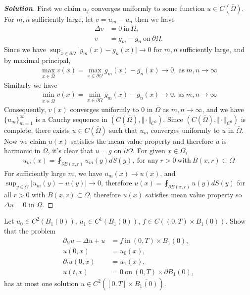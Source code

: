 \documentclass[11pt,reqno]{amsart}
\newcommand{\<}{\langle}
\renewcommand{\>}{\rangle}
\newcommand{\norm}[1]{\vert#1\vert}
\newcommand{\nnorm}[1]{\Vert#1\Vert}
\begin{document}
\begin{enumerate}[label={\arabic*.}]
\begin{proof}[\bf{Solution}]
First we claim $u_j$ converges uniformly to some function $u\in C(\bar{\Omega})$. For $m, n$ sufficiently large, let $v= u_m - u_n$ then we have
\begin{align*}
\Delta v &= 0\ \text{in}\ \Omega,\\
v &=g_m - g_n\ \text{on} \ \partial \Omega.
\end{align*}
Since we have $\displaystyle \sup_{x\in \partial \Omega} \norm{g_m(x) - g_n(x)} \rightarrow 0$ for $m, n$ sufficiently large, and by maximal principal, 
\begin{align*}
\max_{x\in\bar{\Omega}} v(x) = \max_{x\in \partial \Omega} g_m(x) - g_n(x) \rightarrow 0, \ \text{as} \ m,n\rightarrow \infty
\end{align*}
Similarly we have 
\begin{align*}
\min_{x\in\bar{\Omega}} v(x) = \min_{x\in \partial \Omega} g_m(x) - g_n(x) \rightarrow 0, \ \text{as} \ m,n\rightarrow \infty
\end{align*}
Consequently, $v(x)$ converges uniformly to $0$ in $\bar{\Omega}$ as $m, n \rightarrow \infty$, and we have $\{u_m\}_{m=1}^\infty$ is a Cauchy sequence in $(C(\bar{\Omega}), \nnorm{\cdot}_{C^0} )$. Since $(C(\bar{\Omega}), \nnorm{\cdot}_{C^0} )$ is complete, there exists $u \in C(\bar{\Omega})$ such that $u_m$ converges uniformly to $u$ in $\bar{\Omega}$. Now we claim $u(x)$ satisfies the mean value property and therefore $u$ is harmonic in $\Omega$, it's clear that $u=g$ on $\partial \Omega$.
For given $x \in \Omega$,
\begin{align*}
u_m(x) = \fint_{\partial B(x,r)} u_m (y) dS(y), \ \text{for any} \ r>0 \ \text{with} \ B(x,r) \subset \Omega
\end{align*}
For sufficiently large $m$, we have $u_m(x)\rightarrow u(x)$, and $ \sup_{y\in \bar{\Omega}} \norm{u_m(y) -u(y)} \rightarrow 0$, therefore
$u(x) = \fint_{\partial B(x,r)} u(y) dS(y)$ for all $r>0$ with $B(x,r)\subset \Omega$, therefore $u(x)$ satisfies mean value property so $\Delta u = 0$ in $\Omega$.
\end{proof}






\newpage
\begin{tcolorbox}
\item Let $u_0 \in C^2(B_1(0))$, $u_1 \in C^1(B_1(0))$, $f\in C((0,T)\times B_1(0))$. Show that the problem 
\begin{align*}
\partial_{tt} u -\Delta u + u &= f \ \text{in} \ (0,T)\times B_1(0),\\
u(0,x) &= u_0(x),\\
\partial_t u(0,x) &=u_1(x),\\
u(t,x) &= 0 \ \text{on}\ (0,T)\times \partial B_1(0),
\end{align*} 
has at most one solution $u\in C^2([0,T]\times \overline{B_1(0)})$.
\end{tcolorbox}
\bigskip



\end{enumerate}
\end{document}
